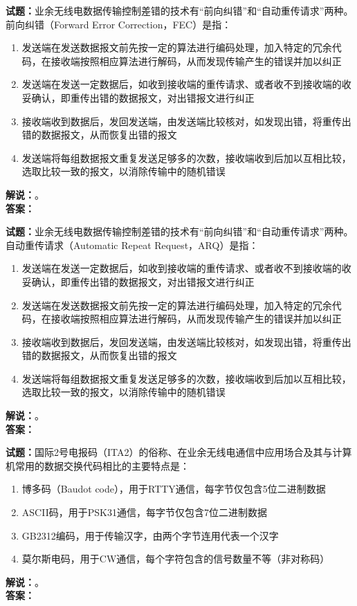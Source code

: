 \documentclass{ctexbook}
\begin{document}
\vspace{\baselineskip}

\noindent\textbf{试题：}业余无线电数据传输控制差错的技术有“前向纠错”和“自动重传请求”两种。前向纠错（Forward Error Correction，FEC）是指：
\begin{enumerate}[leftmargin=3em]
  \item 发送端在发送数据报文前先按一定的算法进行编码处理，加入特定的冗余代码，在接收端按照相应算法进行解码，从而发现传输产生的错误并加以纠正
  \item 发送端在发送一定数据后，如收到接收端的重传请求、或者收不到接收端的收妥确认，即重传出错的数据报文，对出错报文进行纠正
  \item 接收端收到数据后，发回发送端，由发送端比较核对，如发现出错，将重传出错的数据报文，从而恢复出错的报文
  \item 发送端将每组数据报文重复发送足够多的次数，接收端收到后加以互相比较，选取比较一致的报文，以消除传输中的随机错误
\end{enumerate}
\noindent\textbf{解说：}\textbf{}。\\\noindent\textbf{答案：}

\vspace{\baselineskip}

\noindent\textbf{试题：}业余无线电数据传输控制差错的技术有“前向纠错”和“自动重传请求”两种。自动重传请求（Automatic Repeat Request，ARQ）是指：
\begin{enumerate}[leftmargin=3em]
  \item 发送端在发送一定数据后，如收到接收端的重传请求、或者收不到接收端的收妥确认，即重传出错的数据报文，对出错报文进行纠正
  \item 发送端在发送数据报文前先按一定的算法进行编码处理，加入特定的冗余代码，在接收端按照相应算法进行解码，从而发现传输产生的错误并加以纠正
  \item 接收端收到数据后，发回发送端，由发送端比较核对，如发现出错，将重传出错的数据报文，从而恢复出错的报文
  \item 发送端将每组数据报文重复发送足够多的次数，接收端收到后加以互相比较，选取比较一致的报文，以消除传输中的随机错误
\end{enumerate}
\noindent\textbf{解说：}\textbf{}。\\\noindent\textbf{答案：}

\vspace{\baselineskip}

\noindent\textbf{试题：}国际2号电报码（ITA2）的俗称、在业余无线电通信中应用场合及其与计算机常用的数据交换代码相比的主要特点是：
\begin{enumerate}[leftmargin=3em]
  \item 博多码（Baudot code），用于RTTY通信，每字节仅包含5位二进制数据
  \item ASCII码，用于PSK31通信，每字节仅包含7位二进制数据
  \item GB2312编码，用于传输汉字，由两个字节连用代表一个汉字
  \item 莫尔斯电码，用于CW通信，每个字符包含的信号数量不等（非对称码）
\end{enumerate}
\noindent\textbf{解说：}\textbf{}。\\\noindent\textbf{答案：}
\end{document}
